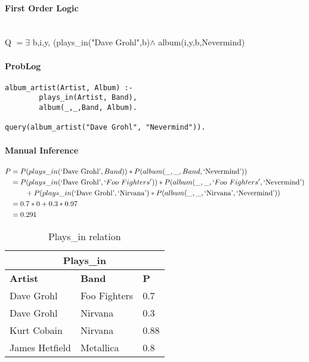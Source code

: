 \documentclass{article}
\begin{document}
\paragraph{First Order Logic} ~\\

Q $= \exists $ b,i,y, (plays\_in("Dave Grohl",b)$ \wedge$ album(i,y,b,Nevermind)

\paragraph{ProbLog}
\begin{verbatim}
album_artist(Artist, Album) :-
        plays_in(Artist, Band),
        album(_,_,Band, Album).
 
query(album_artist("Dave Grohl", "Nevermind")).
\end{verbatim}

\paragraph{Manual Inference}
\begin{equation}
\begin{split}
P & = P(plays\_in(\text{`Dave Grohl'},Band))*P(album(\_,\_,Band,\text{`Nevermind'}))
\\
  & = P(plays\_in(\text{`Dave Grohl'}, `Foo~ Fighters'))*P(album(\_,\_,`Foo~ Fighters',\text{`Nevermind'}) \\& ~~~~~~ + P(plays\_in(\text{`Dave Grohl'}, \text{`Nirvana'})*P(album(\_,\_,\text{`Nirvana'},\text{`Nevermind'}))
 \\ 
 & = 0.7*0 + 0.3*0.97 \\
 & = 0.291
\end{split}
\end{equation}

\begin{table}[!p]

\centering


\begin{tabular}{lll}
\multicolumn{3}{c}{\textbf{Plays\_in}} \\ \hline
\textbf{Artist}          & \textbf{Band}          & \textbf{P} \\
Dave Grohl      & Foo Fighters  & 0.7  \\
Dave Grohl      & Nirvana       & 0.3  \\
Kurt Cobain     & Nirvana       & 0.88 \\
James Hetfield  & Metallica     & 0.8  \\ \hline
\end{tabular}
\caption{Plays\_in relation}
\label{playsin}
\end{table}
\end{document}
